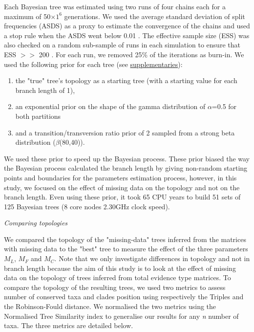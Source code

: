 \documentclass[12pt,letterpaper]{article}
\renewcommand{\subsection}[1]{%
\bigskip
\begin{center}
\begin{large}
\normalfont\itshape #1
\end{large}
\end{center}}
\begin{document}
Each Bayesian tree was estimated using two runs of four chains each for a maximum of 50$\times$$1^6$ generations.
We used the average standard deviation of split frequencies (ASDS) as a proxy to estimate the convergence of the chains and used a stop rule when the ASDS went below 0.01 \citep{Ronquist2012mrbayes}.
The effective sample size (ESS) was also checked on a random sub-sample of runs in each simulation to ensure that ESS $>>$ 200 \citep{drummond2006ess}.
For each run, we removed 25\% of the iterations as burn-in.
We used the following prior for each tree (see \hyperref[supplementaries]{supplementaries}):
\begin{enumerate}
\item
the "true" tree’s topology as a starting tree (with a starting value for each branch length of 1),
\item
an exponential prior on the shape of the gamma distribution of $\alpha$=0.5 for both partitions
\item
and a transition/transversion ratio prior of 2 sampled from a strong beta distribution ($\beta$(80,40)).
\end{enumerate}

We used these prior to speed up the Bayesian process.
These prior biased the way the Bayesian process calculated the branch length by giving non-random starting points and boundaries for the parameters estimation process, however, in this study, we focused on the effect of missing data on the topology and not on the branch length.
Even using these prior, it took 65 CPU years to build 51 sets of 125 Bayesian trees (8 core nodes 2.30GHz clock speed).


\subsection{Comparing topologies}
We compared the topology of the "missing-data" trees inferred from the matrices with missing data to the "best" tree to measure the effect of the three parameters $M_{L}$, $M_{F}$ and $M_{C}$.
Note that we only investigate differences in topology and not in branch length because the aim of this study is to look at the effect of missing data on the topology of trees inferred from total evidence type matrices.
To compare the topology of the resulting trees, we used two metrics to assess number of conserved taxa and clades position using respectively the Triples \citep{dobson1975triplets} and the Robinson-Fould \citep{RF1981} distance.
We normalised the two metrics using the Normalised Tree Similarity index \citep{Bogdanowicz2012} to generalise our results for any \textit{n} number of taxa.
The three metrics are detailed below.
\end{document}
